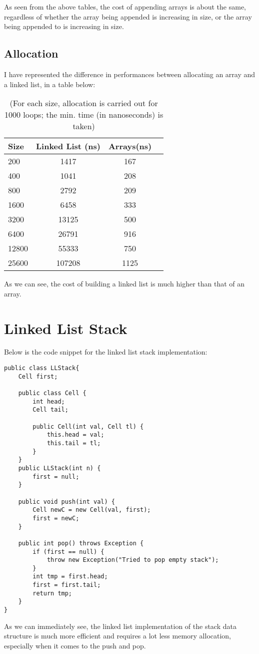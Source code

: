 \documentclass[a4paper,11pt]{article}
\begin{document}
As seen from the above tables, the cost of appending arrays is about the same, regardless of whether the array being appended is increasing in size, or the array being appended to is increasing in size.



\subsection*{Allocation}

I have represented the difference in performances between allocating an array and a linked list, in a table below:

\begin{table}[h]
\begin{center}
\begin{tabular}{l|c|c|c}
\textbf{Size} & \textbf{Linked List (ns)} & \textbf{Arrays(ns)}\\
\hline
  200      &  1417 &     167\\
  400      &  1041 &     208\\
  800      &  2792 &     209\\
  1600      &  6458 &     333\\
  3200      &  13125 &     500\\
  6400      &  26791 &     916\\
  12800      &  55333 &     750\\
  25600      &  107208 &     1125\\
\end{tabular}
\caption{(For each size, allocation is carried out for 1000 loops; the min. time (in nanoseconds) is taken)}
\label{tab:table1}
\end{center}
\end{table}
As we can see, the cost of building a linked list is much higher than that of an array.

\section*{Linked List Stack}

Below is the code snippet for the linked list stack implementation:
\begin{verbatim}
public class LLStack{
    Cell first;

	public class Cell {
        int head;
        Cell tail;
    
        public Cell(int val, Cell tl) {
            this.head = val;
            this.tail = tl;
        }
    }  
    public LLStack(int n) {
        first = null;
    }

	public void push(int val) {
		Cell newC = new Cell(val, first);
		first = newC;
	}

	public int pop() throws Exception {
		if (first == null) {
			throw new Exception("Tried to pop empty stack");
		}
		int tmp = first.head;
		first = first.tail;
		return tmp;
	}
}
\end{verbatim}
As we can immediately see, the linked list implementation of the stack data structure is much more efficient and requires a lot less memory allocation, especially when it comes to the push and pop.
\end{document}
